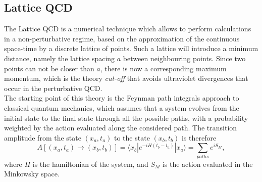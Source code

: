 \documentclass[b5paper,10pt,twoside,oldstyle,classica]{toptesi}
\begin{document}
\subsection{Lattice QCD}
The Lattice QCD is a numerical technique which allows to perform calculations in a non-perturbative regime, based on the approximation of the continuous space-time by a discrete lattice of points. Such a lattice will introduce a minimum distance, namely the lattice spacing $a$ between neighbouring points. Since two points can not be closer than $a$, there is now a corresponding maximum momentum, which is the theory \textit{cut-off} that avoids ultraviolet divergences that occur in the perturbative QCD.\\
The starting point of this theory is the Feynman path integrals approach to classical quantum mechanics, which assumes that a system evolves from the initial state to the final state through all the possible paths, with a probability weighted by the action evaluated along the considered path.
The transition amplitude from the state $(x_a, t_a)$ to the state $(x_b, t_b)$ is therefore
\begin{equation}
 A[(x_a,t_a) \rightarrow (x_b,t_b)] = \langle x_b | e^{-iH(t_b-t_a)} | x_a \rangle = \sum_{paths} e^{iS_M},
\end{equation}
where $H$ is the hamiltonian of the system, and $S_M$ is the action evaluated in the Minkowsky space.
\end{document}
